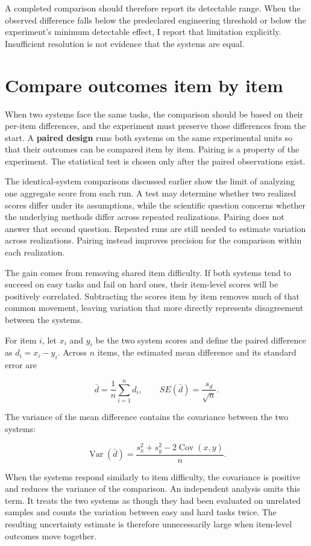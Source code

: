 A completed comparison should therefore report its detectable range. When the observed difference falls below the predeclared engineering threshold or below the experiment's minimum detectable effect, I report that limitation explicitly. Insufficient resolution is not evidence that the systems are equal.

\section{Compare outcomes item by item}\label{compare-outcomes-item-by-item}

When two systems face the same tasks, the comparison should be based on their per-item differences, and the experiment must preserve those differences from the start. A \textbf{paired design} runs both systems on the same experimental units so that their outcomes can be compared item by item. Pairing is a property of the experiment. The statistical test is chosen only after the paired observations exist.

The identical-system comparisons discussed earlier show the limit of analyzing one aggregate score from each run. A test may determine whether two realized scores differ under its assumptions, while the scientific question concerns whether the underlying methods differ across repeated realizations. Pairing does not answer that second question. Repeated runs are still needed to estimate variation across realizations. Pairing instead improves precision for the comparison within each realization.

The gain comes from removing shared item difficulty. If both systems tend to succeed on easy tasks and fail on hard ones, their item-level scores will be positively correlated. Subtracting the scores item by item removes much of that common movement, leaving variation that more directly represents disagreement between the systems.

For item \(i\), let \(x_i\) and \(y_i\) be the two system scores and define the paired difference as \(d_i=x_i-y_i\). Across \(n\) items, the estimated mean difference and its standard error are

\[
\bar d=\frac{1}{n}\sum_{i=1}^{n}d_i,
\qquad
SE(\bar d)=\frac{s_d}{\sqrt n}.
\]

The variance of the mean difference contains the covariance between the two systems:

\[
\operatorname{Var}(\bar d)
=\frac{s_x^2+s_y^2-2\operatorname{Cov}(x,y)}{n}.
\]

When the systems respond similarly to item difficulty, the covariance is positive and reduces the variance of the comparison. An independent analysis omits this term. It treats the two systems as though they had been evaluated on unrelated samples and counts the variation between easy and hard tasks twice. The resulting uncertainty estimate is therefore unnecessarily large when item-level outcomes move together.

